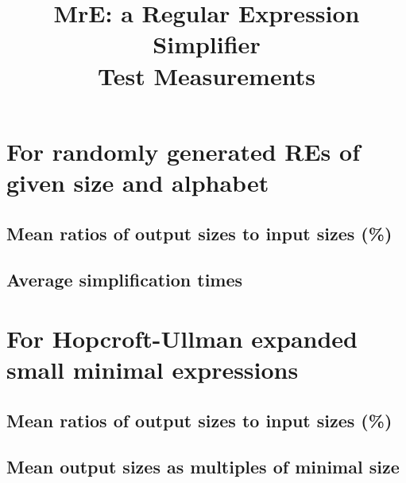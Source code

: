 \documentclass[a4paper]{article}
\title{MrE: a Regular Expression Simplifier \\ Test Measurements}
\begin{document}
\section{For randomly generated REs of given size and alphabet}
\subsection{Mean ratios of output sizes to input sizes (\%)}

\subsection{Average simplification times}

\section{For Hopcroft-Ullman expanded small minimal expressions}
\subsection{Mean ratios of output sizes to input sizes (\%)}

\subsection{Mean output sizes as multiples of minimal size}

\end{document}
